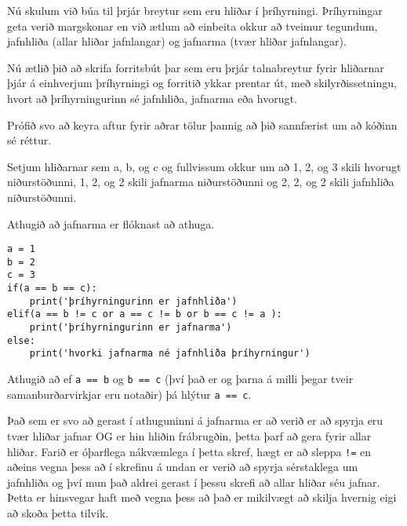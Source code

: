\begin{exercise}\label{exp4}
Nú skulum við búa til þrjár breytur sem eru hliðar í þríhyrningi.
Þríhyrningar geta verið margskonar en við ætlum að einbeita okkur að tveimur tegundum, jafnhliða (allar hliðar jafnlangar) og jafnarma (tvær hliðar jafnlangar).

Nú ætlið þið að skrifa forritsbút þar sem eru þrjár talnabreytur fyrir hliðarnar þjár á einhverjum þríhyrningi og forritið ykkar prentar út, með skilyrðissetningu, hvort að þríhyrningurinn sé jafnhliða, jafnarma eða hvorugt.

Prófið svo að keyra aftur fyrir aðrar tölur þannig að þið sannfærist um að kóðinn sé réttur.
\end{exercise}
\begin{Answer}[ref={exp4}]
Setjum hliðarnar sem a, b, og c og fullvissum okkur um að 1, 2, og 3 skili hvorugt niðurstöðunni, 1, 2, og 2 skili jafnarma niðurstöðunni og 2, 2, og 2 skili jafnhliða niðurstöðunni.

Athugið að jafnarma er flóknast að athuga.
	\begin{lstlisting}
a = 1
b = 2
c = 3
if(a == b == c):
	print('þríhyrningurinn er jafnhliða')
elif(a == b != c or a == c != b or b == c != a ):
	print('þríhyrningurinn er jafnarma')
else:
	print('hvorki jafnarma né jafnhliða þríhyrningur')\end{lstlisting}

Athugið að ef \texttt{a == b} og \texttt{b == c} (því það er og þarna á milli þegar tveir samanburðarvirkjar eru notaðir) þá hlýtur \texttt{a == c}.

Það sem er svo að gerast í athuguninni á jafnarma er að verið er að spyrja eru tvær hliðar jafnar OG er hin hliðin frábrugðin, þetta þarf að gera fyrir allar hliðar.
Farið er óþarflega nákvæmlega í þetta skref, hægt er að sleppa \texttt{!=} en aðeins vegna þess að í skrefinu á undan er verið að spyrja sérstaklega um jafnhliða og því mun það aldrei gerast í þessu skrefi að allar hliðar séu jafnar.
Þetta er hinsvegar haft með vegna þess að það er mikilvægt að skilja hvernig eigi að skoða þetta tilvik.
\end{Answer}

